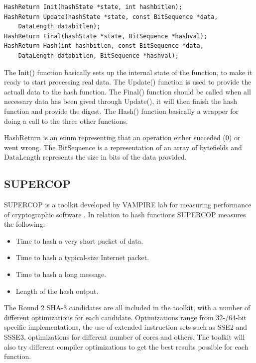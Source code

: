 \documentclass[english,12pt,a4paper]{book}
\begin{document}
\begin{verbatim}
HashReturn Init(hashState *state, int hashbitlen);
HashReturn Update(hashState *state, const BitSequence *data, 
    DataLength databitlen);
HashReturn Final(hashState *state, BitSequence *hashval);
HashReturn Hash(int hashbitlen, const BitSequence *data, 
    DataLength databitlen, BitSequence *hashval);
\end{verbatim}

The Init() function basically sets up the internal state of the function, to
make it ready to start processing real data. The Update() function is used to
provide the actuall data to the hash function. The Final() function should be
called when all necessary data has been gived through Update(), it will then
finish the hash function and provide the digest. The Hash() function basically a wrapper
for doing a call to the three other functions.

HashReturn is an enum representing that an operation either succeded (0) or
went wrong. The BitSequence is a representation of an array of bytefields and
DataLength represents the size in bits of the data provided.

\subsection{\ac{SUPERCOP}}
\ac{SUPERCOP} is a toolkit developed by VAMPIRE lab for measuring performance
of cryptographic software \cite{s_supercop}. In relation to hash functions
\ac{SUPERCOP} measures the following:

\begin{itemize}
    \item Time to hash a very short packet of data.
    \item Time to hash a typical-size Internet packet.
    \item Time to hash a long message.
    \item Length of the hash output.
\end{itemize}

The Round 2 \ac{SHA}-3 candidates are all included in the toolkit, with a number
of different optimizations for each candidate. Optimizations range from
32-/64-bit specific implementations, the use of extended instruction sets such
as \ac{SSE2} and \ac{SSSE3}, optimizations for different number of cores and
others. The toolkit will also try different compiler optimizations to get the
best results possible for each function.
\end{document}
